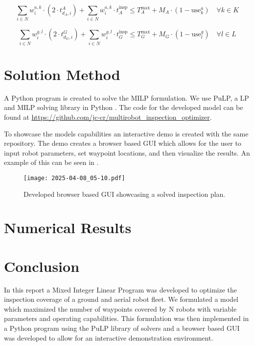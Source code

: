 \documentclass{article}
\begin{document}
				\begin{equation}
					\sum_{i \in N} w_i^{a,k} \cdot \left( 2 \cdot t_{d_A,i}^{A}\right) + \sum_{i \in N} w_i^{a,k} \cdot t_A^{\text{insp}} \leq T_A^{\max} + M_A \cdot (1 - \text{use}_k^a) \quad \forall k \in K
				\end{equation}


				\begin{equation}
					\sum_{i \in N} w_i^{g,l} \cdot \left( 2 \cdot t_{d_G,i}^{G}\right) + \sum_{i \in N} w_i^{g,l} \cdot t_G^{\text{insp}} \leq T_G^{\max} + M_G \cdot (1 - \text{use}_l^g) \quad \forall l \in L
				\end{equation}


	\section{Solution Method}

		A Python program is created to solve the MILP formulation. 
		We use PuLP, a LP and MILP solving library in Python \cite{pulp}.
		The code for the developed model can be found at \url{https://github.com/jc-cr/multirobot_inspection_optimizer}.

		To showcase the models capabilities an interactive demo is created with the same repository. 
		The demo creates a browser based GUI which allows for the user to input robot parameters, set waypoint locations, and then visualize the results.
		An example of this can be seen in .

		\begin{figure}[htbp]
			\centering
			\texttt{[image: 2025-04-08\_05-10.pdf]}
			\caption{Developed browser based GUI showcasing a solved inspection plan.}
			\label{fig:demo}
		\end{figure}


	\section{Numerical Results}




	\section{Conclusion}

	In this report a Mixed Integer Linear Program was developed to optimize the inspection coverage of a ground and aerial robot fleet. 
	We formulated a model which maximized the number of waypoints covered by N robots with variable parameters and operating capabilities.
	This formulation was then implemented in a Python program using the PuLP library of solvers and a browser based GUI was developed to allow for an interactive demonstration environment.

	\newpage
	
	\nocite{*}
	
\end{document}
